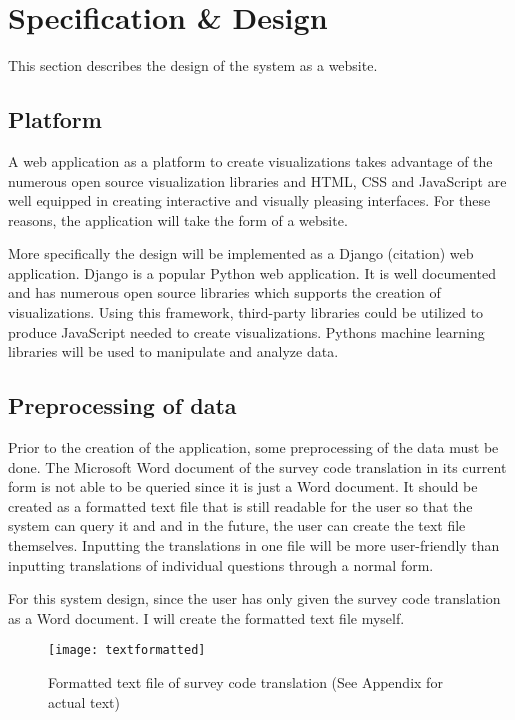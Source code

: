 \chapter{Specification \& Design}

This section describes the design of the system as a website.

\section{Platform}
A web application as a platform to create visualizations takes advantage of the numerous open source visualization libraries and HTML, CSS and JavaScript are well equipped in creating interactive and visually pleasing interfaces. For these reasons, the application will take the form of a website.\par

More specifically the design will be implemented as a Django (citation) web application. Django is a popular Python web application. It is well documented and has numerous open source libraries which supports the creation of visualizations. Using this framework, third-party libraries could be utilized to produce JavaScript needed to create visualizations. Python\textquotesingle s machine learning libraries will be used to manipulate and analyze data.

\section{Preprocessing of data} \label{preprocessing}
Prior to the creation of the application, some preprocessing of the data must be done. The Microsoft Word document of the survey code translation in its current form is not able to be queried since it is just a Word document. It should be created as a formatted text file that is still readable for the user so that the system can query it and and in the future, the user can create the text file themselves. Inputting the translations in one file will be more user-friendly than inputting translations of individual questions through a normal form.\par

For this system design, since the user has only given the survey code translation as a Word document. I will create the formatted text file myself.\par


\begin{figure}[h]
\centering
\texttt{[image: textformatted]}
\caption{Formatted text file of survey code translation (See Appendix for actual text)}
\end{figure}

